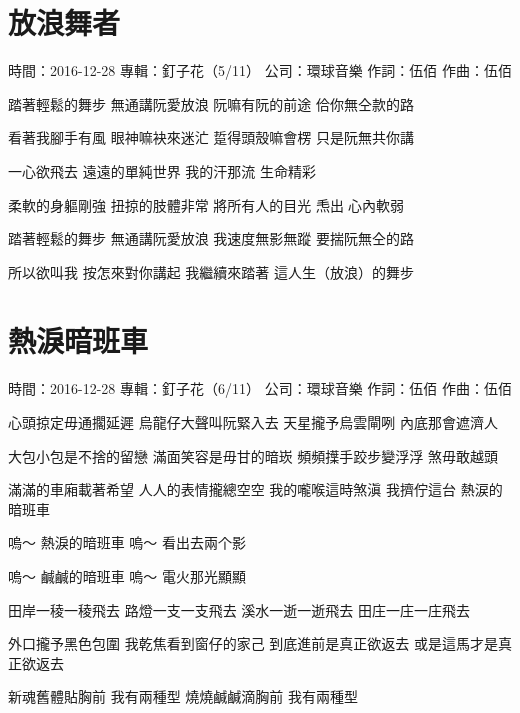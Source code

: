 \documentclass[UTF8,a4paper,oneside,twocolumn,12pt]{ctexbook}
\newcommand{\infopair}[2]{\textbullet #1：#2}
\newcommand{\zc}[1][伍佰]{\infopair{作詞}{#1}}
\newcommand{\zq}[1][伍佰]{\infopair{作曲}{#1}}
\newcommand{\zj}[1]{\infopair{專輯}{#1}}
\newcommand{\sj}[1]{\infopair{時間}{#1}}
\newcommand{\gs}[1]{\infopair{公司}{#1}}
\newenvironment{info}{\begin{flushleft}\kaishu
	}
	{\end{flushleft}\normalsize\yahei\par}
\newenvironment{lyric}{
	}
{}
\begin{document}
\section{放浪舞者}
\begin{info}
	\sj{2016-12-28}
	\zj{釘子花（5/11）}
	\gs{環球音樂}
	\zc
	\zq
\end{info}
\begin{lyric}
	踏著輕鬆的舞步
	無通講阮愛放浪
	阮嘛有阮的前途
	佮你無仝款的路

	看著我腳手有風
	眼神嘛袂來迷汒
	踅得頭殼嘛會楞
	只是阮無共你講

	一心欲飛去 遠遠的單純世界
	我的汗那流 生命精彩

	柔軟的身軀剛強
	扭掠的肢體非常
	將所有人的目光
	𤆬出𪜶心內軟弱

	踏著輕鬆的舞步
	無通講阮愛放浪
	我速度無影無蹤
	要揣阮無仝的路

	所以欲叫我 按怎來對你講起
	我繼續來踏著 這人生（放浪）的舞步
\end{lyric}

\section{熱淚暗班車}
\begin{info}
	\sj{2016-12-28}
	\zj{釘子花（6/11）}
	\gs{環球音樂}
	\zc
	\zq
\end{info}
\begin{lyric}
	心頭掠定毋通擱延遲
	烏龍仔大聲叫阮緊入去
	天星攏予烏雲閘咧
	內底那會遮濟人

	大包小包是不捨的留戀
	滿面笑容是毋甘的暗崁
	頻頻擛手跤步變浮浮
	煞毋敢越頭

	滿滿的車廂載著希望
	人人的表情攏總空空
	我的嚨喉這時煞滇
	我擠佇這台 熱涙的暗班車

	嗚～ 熱淚的暗班車
	嗚～ 看出去兩个影

	嗚～ 鹹鹹的暗班車
	嗚～ 電火那光顯顯

	田岸一稜一稜飛去
	路燈一支一支飛去
	溪水一逝一逝飛去
	田庄一庄一庄飛去

	外口攏予黑色包圍
	我乾焦看到窗仔的家己
	到底進前是真正欲返去
	或是這馬才是真正欲返去

	新魂舊體貼胸前 我有兩種型
	燒燒鹹鹹滴胸前 我有兩種型
\end{lyric}
\end{document}
